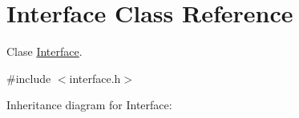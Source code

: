 \hypertarget{classInterface}{}\section{Interface Class Reference}
\label{classInterface}


Clase \hyperlink{classInterface}{Interface}.  




{\ttfamily \#include $<$interface.\+h$>$}



Inheritance diagram for Interface\+:

